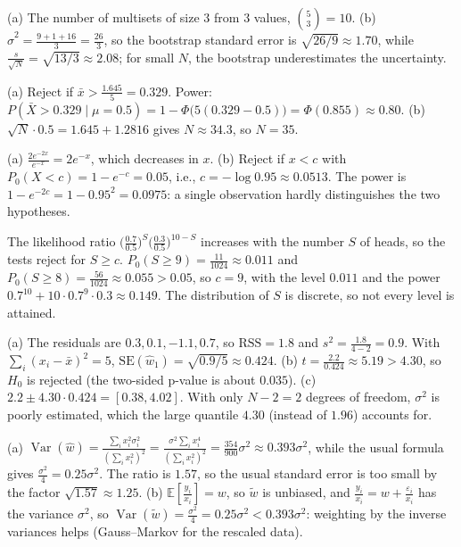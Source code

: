 \documentclass[11pt]{article}
\newcommand{\E}{\mathbb{E}}
\DeclareMathOperator{\Var}{Var}
\begin{document}
\begin{description}[leftmargin=0pt, itemsep=0.3em]
    \item[\ref{pr:bootstrap-mean}.] (a) The number of multisets of size $3$ from $3$ values, $\binom{5}{3} = 10$. (b) $\hat\sigma^2 = \frac{9 + 1 + 16}{3} = \frac{26}{3}$, so the bootstrap standard error is $\sqrt{26/9} \approx 1.70$, while $\frac{s}{\sqrt{N}} = \sqrt{13/3} \approx 2.08$; for small $N$, the bootstrap underestimates the uncertainty.
    \item[\ref{pr:power}.] (a) Reject if $\bar x > \frac{1.645}{5} = 0.329$. Power: $P(\bar X > 0.329 \mid \mu = 0.5) = 1 - \Phi\big(5(0.329 - 0.5)\big) = \Phi(0.855) \approx 0.80$. (b) $\sqrt{N} \cdot 0.5 = 1.645 + 1.2816$ gives $N \approx 34.3$, so $N = 35$.
    \item[\ref{pr:np-practice}.] (a) $\frac{2e^{-2x}}{e^{-x}} = 2e^{-x}$, which decreases in $x$. (b) Reject if $x < c$ with $P_0(X < c) = 1 - e^{-c} = 0.05$, i.e., $c = -\log 0.95 \approx 0.0513$. The power is $1 - e^{-2c} = 1 - 0.95^2 = 0.0975$: a single observation hardly distinguishes the two hypotheses.
    \item[\ref{pr:np-coin}.] The likelihood ratio $\big(\frac{0.7}{0.5}\big)^S\big(\frac{0.3}{0.5}\big)^{10 - S}$ increases with the number $S$ of heads, so the tests reject for $S \geq c$. $P_0(S \geq 9) = \frac{11}{1024} \approx 0.011$ and $P_0(S \geq 8) = \frac{56}{1024} \approx 0.055 > 0.05$, so $c = 9$, with the level $0.011$ and the power $0.7^{10} + 10 \cdot 0.7^9 \cdot 0.3 \approx 0.149$. The distribution of $S$ is discrete, so not every level is attained.
    \item[\ref{pr:regression-t}.] (a) The residuals are $0.3, 0.1, -1.1, 0.7$, so $\mathrm{RSS} = 1.8$ and $s^2 = \frac{1.8}{4 - 2} = 0.9$. With $\sum_i (x_i - \bar x)^2 = 5$, $\mathrm{SE}(\hat w_1) = \sqrt{0.9/5} \approx 0.424$. (b) $t = \frac{2.2}{0.424} \approx 5.19 > 4.30$, so $H_0$ is rejected (the two-sided p-value is about $0.035$). (c) $2.2 \pm 4.30 \cdot 0.424 = [0.38, 4.02]$. With only $N - 2 = 2$ degrees of freedom, $\sigma^2$ is poorly estimated, which the large quantile $4.30$ (instead of $1.96$) accounts for.
    \item[\ref{pr:hetero-practice}.] (a) $\Var(\hat w) = \frac{\sum_i x_i^2\sigma_i^2}{(\sum_i x_i^2)^2} = \frac{\sigma^2\sum_i x_i^4}{(\sum_i x_i^2)^2} = \frac{354}{900}\sigma^2 \approx 0.393\sigma^2$, while the usual formula gives $\frac{\sigma^2}{4} = 0.25\sigma^2$. The ratio is $1.57$, so the usual standard error is too small by the factor $\sqrt{1.57} \approx 1.25$. (b) $\E[\frac{y_i}{x_i}] = w$, so $\tilde w$ is unbiased, and $\frac{y_i}{x_i} = w + \frac{\varepsilon_i}{x_i}$ has the variance $\sigma^2$, so $\Var(\tilde w) = \frac{\sigma^2}{4} = 0.25\sigma^2 < 0.393\sigma^2$: weighting by the inverse variances helps (Gauss--Markov for the rescaled data).
\end{description}
\end{document}

